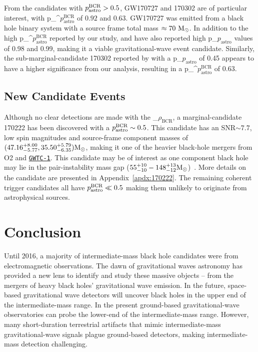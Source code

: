 \documentclass[%
 nofootinbib,
 amsmath,amssymb,
 aps,
 twocolumn,
 superscriptaddress
]{revtex4-2}
\newcommand{\GWTC}{{\sc \href{https://ui.adsabs.harvard.edu/abs/2019PhRvX...9c1040A/abstract}{\texttt{GWTC-1}}}\xspace}
\newcommand{\fancytext}[1]{{\relax\ifmmode#1\else $#1$\fi}\xspace}
\newcommand{\mathcmd}[1]{{\sc \relax\ifmmode#1\else $#1$\fi}\xspace}
\newcommand{\bcr}{\mathcmd{\rho_\text{BCR}}}
\newcommand{\msun}{\mathcmd{\text{M}_\odot}}
\newcommand{\pastro}{\fancytext{p_\text{astro}}}
\newcommand{\pastrobcr}{\fancytext{p_\text{astro}^{\text{BCR}}}}
\begin{document}
From the candidates with $\pastrobcr>0.5$, GW170727 and 170302 are of particular interest, with \pastrobcr of $0.92$ and $0.63$. GW170727 was emitted from a black hole binary system with a source frame total mass $\approx 70\ \msun$. In addition to the high \pastrobcr reported by our study, \citet{IAS1} and \citet{pycbc_ogc_2} have also reported high \pastro values of 0.98 and 0.99, making it a viable gravitational-wave event candidate. Similarly, the sub-marginal-candidate 170302 reported by \cite{IAS1} with a \pastro of 0.45 appears to have a higher significance from our analysis, resulting in a \pastrobcr of $0.63$.  


\subsection{New Candidate Events}
Although no clear detections are made with the \bcr, a marginal-candidate 170222 has been discovered with a $\pastrobcr\sim0.5$. This candidate has an SNR$\sim7.7$, low spin magnitudes and source-frame component masses of $({47.16}_{-5.77}^{+8.00}, {35.50}_{-6.35}^{+5.79}) \msun$, making it one of the heavier black-hole mergers from O2 and \GWTC. This candidate may be of interest as one component black hole may lie in the pair-instability mass gap ($55^{+10}_{-10}-148^{+13}_{-12}\msun$)~\cite{Woosley:2021:arXiv, Heger:2002:ApJ}. More details on the candidate are presented in Appendix~\ref{apdx:170222}. The remaining coherent trigger candidates all have $\pastrobcr\ll0.5$ making them unlikely to originate from astrophysical sources. 



\section{\label{sec:Conclusion}Conclusion}

Until 2016, a majority of intermediate-mass black hole candidates were from electromagnetic observations. The dawn of gravitational waves astronomy has provided a new lens to identify and study these massive objects -- from the mergers of heavy black holes' gravitational wave emission. In the future, space-based gravitational wave detectors will uncover black holes in the upper end of the intermediate-mass range. In the present ground-based gravitational-wave observatories can probe the lower-end of the intermediate-mass range. However, many short-duration terrestrial artifacts that mimic intermediate-mass gravitational-wave signals plague ground-based detectors, making intermediate-mass detection challenging. 
\end{document}
